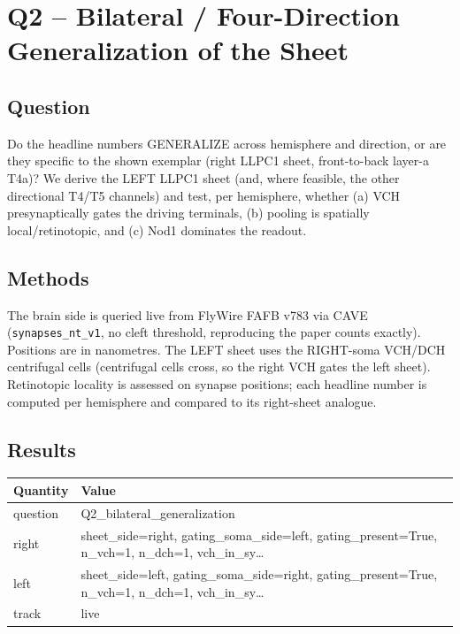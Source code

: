 \documentclass[11pt]{article}
\begin{document}
\section{Q2 -- Bilateral / Four-Direction Generalization of the Sheet}

\subsection*{Question}
Do the headline numbers GENERALIZE across hemisphere and direction, or are they specific to the shown exemplar (right LLPC1 sheet, front-to-back layer-a T4a)? We derive the LEFT LLPC1 sheet (and, where feasible, the other directional T4/T5 channels) and test, per hemisphere, whether (a) VCH presynaptically gates the driving terminals, (b) pooling is spatially local/retinotopic, and (c) Nod1 dominates the readout.

\subsection*{Methods}
The brain side is queried live from FlyWire FAFB v783 via CAVE (\texttt{synapses\_nt\_v1}, no cleft threshold, reproducing the paper counts exactly). Positions are in nanometres. The LEFT sheet uses the RIGHT-soma VCH/DCH centrifugal cells (centrifugal cells cross, so the right VCH gates the left sheet). Retinotopic locality is assessed on synapse positions; each headline number is computed per hemisphere and compared to its right-sheet analogue.

\subsection*{Results}
\begin{longtable}{@{}p{}p{}@{}}
\toprule
\textbf{Quantity} & \textbf{Value} \\
\midrule
\endhead
question & Q2\_bilateral\_generalization \\
right & sheet\_side=right, gating\_soma\_side=left, gating\_present=True, n\_vch=1, n\_dch=1, vch\_in\_sy… \\
left & sheet\_side=left, gating\_soma\_side=right, gating\_present=True, n\_vch=1, n\_dch=1, vch\_in\_sy… \\
track & live \\
\bottomrule
\end{longtable}
\end{document}
